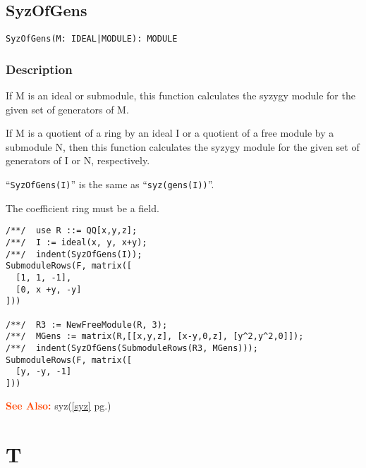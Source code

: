 \documentclass[a4paper]{mybook}
\newenvironment{command}{}{} %
\newcommand\SeeAlso{\par\textcolor{OrangeRed}{\textbf{\large See Also: }}}
\begin{document}
\section{SyzOfGens}
\label{SyzOfGens}
\begin{command} %


\begin{Verbatim}[label=syntax, rulecolor=\color{MidnightBlue},
frame=single]
SyzOfGens(M: IDEAL|MODULE): MODULE
\end{Verbatim}


\subsection*{Description}

If M is an ideal or submodule, this function calculates the syzygy
module for the given set of generators of M.
\par 
If M is a quotient of a ring by an ideal I or a quotient of a free
module by a submodule N, then this function calculates the syzygy
module for the given set of generators of I or N, respectively.
\par 
``\verb&SyzOfGens(I)&'' is the same as ``\verb&syz(gens(I))&''.
\par 
The coefficient ring must be a field.
\begin{Verbatim}[label=example, rulecolor=\color{PineGreen}, frame=single]
/**/  use R ::= QQ[x,y,z];
/**/  I := ideal(x, y, x+y);
/**/  indent(SyzOfGens(I));
SubmoduleRows(F, matrix([
  [1, 1, -1],
  [0, x +y, -y]
]))

/**/  R3 := NewFreeModule(R, 3);
/**/  MGens := matrix(R,[[x,y,z], [x-y,0,z], [y^2,y^2,0]]);
/**/  indent(SyzOfGens(SubmoduleRows(R3, MGens)));
SubmoduleRows(F, matrix([
  [y, -y, -1]
]))
\end{Verbatim}


\SeeAlso %
  syz(\ref{syz} pg.\pageref{syz})
\end{command} %

\chapter{T}  %
\label{T}
\end{document}
